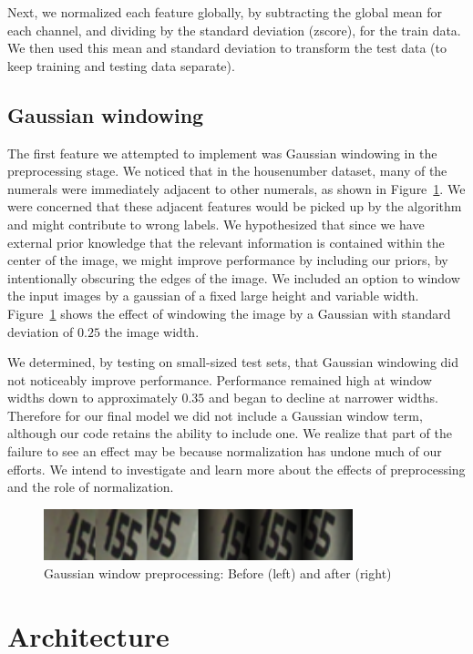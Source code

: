 \documentclass{article}
\begin{document}
Next, we normalized each feature globally, by subtracting the global mean for
each channel, and dividing by the standard deviation (zscore), for the train
data. We then used this mean and standard deviation to transform the test data
(to keep training and testing data separate).

\subsection{Gaussian windowing}
The first feature we attempted to implement was Gaussian windowing in the preprocessing stage. We noticed that in the housenumber dataset, many of the numerals were immediately adjacent to other numerals, as shown in Figure~\ref{fig1}. We were concerned that these adjacent features would be picked up by the algorithm and might contribute to wrong labels. We hypothesized that since we have external prior knowledge that the relevant information is contained within the center of the image, we might improve performance by including our priors, by intentionally obscuring the edges of the image. We included an option to window the input images by a gaussian of a fixed large height and variable width. Figure~\ref{fig1} shows the effect of windowing the image by a Gaussian with standard deviation of $0.25$ the image width. 

We determined, by testing on small-sized test sets, that Gaussian windowing did not noticeably improve performance. Performance remained high at window widths down to approximately $0.35$ and began to decline at narrower widths. Therefore for our final model we did not include a Gaussian window term, although our code retains the ability to include one. We realize that part of the failure to see an effect may be because normalization has undone much of our efforts. We intend to investigate and learn more about the effects of preprocessing and the role of normalization.

\begin{figure}[h]
          \centering
          \includegraphics[width=0.8\textwidth]{housenumbers_win.png}
          \caption{Gaussian window preprocessing: Before (left) and after (right)}
          \label{fig1}
\end{figure}

\section{Architecture}
\end{document}
